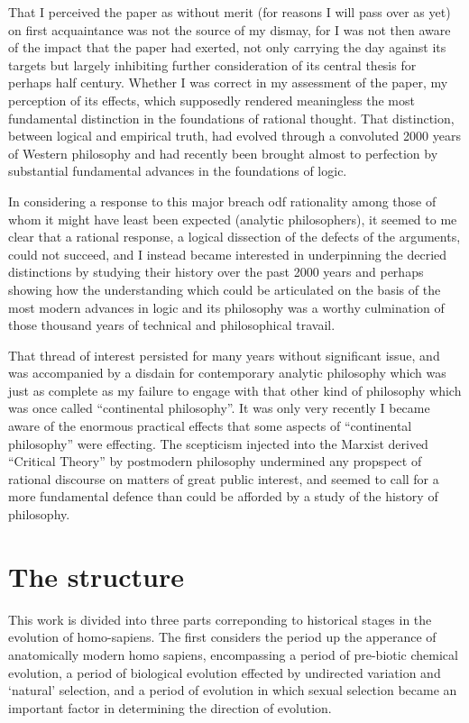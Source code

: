 \documentclass[10pt,titlepage]{book}
\begin{document}
That I perceived the paper as without merit (for reasons I will pass over as yet) on first acquaintance was not the source of my dismay, for I was not then aware of the impact that the paper had exerted, not only carrying the day against its targets but largely inhibiting further consideration of its central thesis for perhaps half century.
Whether I was correct in my assessment of the paper, my perception of its effects, which supposedly rendered meaningless the most fundamental distinction in the foundations of rational thought.
That distinction, between logical and empirical truth, had evolved through a convoluted 2000 years of Western philosophy and had recently been brought almost to perfection by substantial fundamental advances in the foundations of logic.

In considering a response to this major breach odf rationality among those of whom it might have least been expected (analytic philosophers), it seemed to me clear that a rational response, a logical dissection of the defects of the arguments, could not succeed, and I instead became interested in underpinning the decried distinctions by studying their history over the past 2000 years and perhaps showing how the understanding which could be articulated on the basis of the most modern advances in logic and its philosophy was a worthy culmination of those thousand years of technical and philosophical travail.

That thread of interest persisted for many years without significant issue, and was accompanied by a disdain for contemporary analytic philosophy which was just as complete as my failure to engage with that other kind of philosophy which was once called ``continental philosophy''.
It was only very recently I became aware of the enormous practical effects that some aspects of ``continental philosophy'' were effecting.
The scepticism injected into the Marxist derived ``Critical Theory'' by postmodern philosophy undermined any propspect of rational discourse on matters of great public interest, and seemed to call for a more fundamental defence than could be afforded by a study of the history of philosophy.

\section{The structure}

This work is divided into three parts correponding to historical stages in the evolution of homo-sapiens.
The first considers the period up the apperance of anatomically modern homo sapiens, encompassing a period of pre-biotic chemical evolution, a period of biological evolution effected by undirected variation and `natural' selection, and a period of evolution in which sexual selection became an important factor in determining the direction of evolution.
\end{document}
